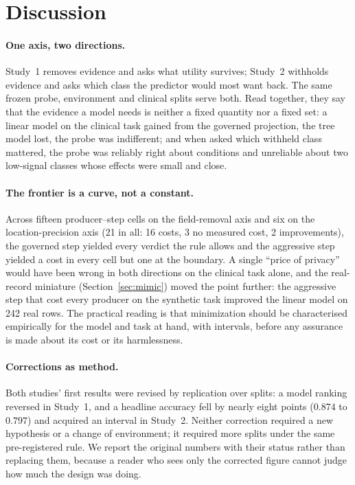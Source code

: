 \documentclass[11pt]{article}
\begin{document}
\section{Discussion}
\label{sec:discussion}

\paragraph{One axis, two directions.} Study~1 removes evidence and asks what utility survives; Study~2 withholds evidence and asks which class the predictor would most want back. The same frozen probe, environment and clinical splits serve both. Read together, they say that the evidence a model needs is neither a fixed quantity nor a fixed set: a linear model on the clinical task gained from the governed projection, the tree model lost, the probe was indifferent; and when asked which withheld class mattered, the probe was reliably right about conditions and unreliable about two low-signal classes whose effects were small and close.

\paragraph{The frontier is a curve, not a constant.} Across fifteen producer--step cells on the field-removal axis and six on the location-precision axis (21 in all: 16 costs, 3 no measured cost, 2 improvements), the governed step yielded every verdict the rule allows and the aggressive step yielded a cost in every cell but one at the boundary. A single ``price of privacy'' would have been wrong in both directions on the clinical task alone, and the real-record miniature (Section~\ref{sec:mimic}) moved the point further: the aggressive step that cost every producer on the synthetic task improved the linear model on 242 real rows. The practical reading is that minimization should be characterised empirically for the model and task at hand, with intervals, before any assurance is made about its cost or its harmlessness.

\paragraph{Corrections as method.} Both studies' first results were revised by replication over splits: a model ranking reversed in Study~1, and a headline accuracy fell by nearly eight points ($0.874$ to $0.797$) and acquired an interval in Study~2. Neither correction required a new hypothesis or a change of environment; it required more splits under the same pre-registered rule. We report the original numbers with their status rather than replacing them, because a reader who sees only the corrected figure cannot judge how much the design was doing.
\end{document}
